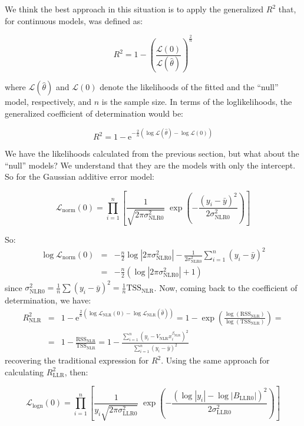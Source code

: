 We think the best approach in this situation is to apply the generalized $R^2$ that, for continuous models, was defined as\cite{genR2}:
\begin{linenomath}
$$ R^2 = 1 - \left(\frac{\mathcal{L}(0)}{\mathcal{L}(\hat\theta)}\right)^{\!\!\frac{2}{n}} $$
\end{linenomath}
where $\mathcal{L}(\hat\theta)$ and $\mathcal{L}(0)$  denote the likelihoods of the fitted and the ``null'' model, respectively, and $n$ is the sample size. In terms of the loglikelihoods, the generalized coefficient of determination would be:
\begin{linenomath}
$$ R^2 = 1 - \mathrm{e}^{-\frac{2}{n}\left(\log\mathcal{L}(\hat\theta)-\log\mathcal{L}(0)\right)} $$
\end{linenomath}
We have the likelihoods calculated from the previous section, but what about the ``null'' models? We understand that they are the models with only the intercept. So for the Gaussian additive error model:
\begin{linenomath}
$$\mathcal{L}_\text{norm}(0) = \prod_{i=1}^n\left[\frac{1}{\sqrt{2\pi\sigma^2_\text{NLR0}}}\;\exp{\left(-\frac{\left(y_i-\bar y\right)^2}{2\sigma^2_\text{NLR0}}\right)}\right]$$
\end{linenomath}
So:
\begin{eqnarray*}
\log\mathcal{L}_\text{norm}(0) &=& -\frac{n}{2}\log\left|2\pi\sigma^2_\text{NLR0}\right| - \frac{1}{2\sigma^2_\text{NLR0}}\sum_{i=1}^n\left(y_i-\bar y\right)^2\\
 &=& -\frac{n}{2}\left(\log\left|2\pi\sigma^2_\text{NLR0}\right| + 1 \right)
\end{eqnarray*}
since $\sigma^2_\text{NLR0}=\frac{1}{n}\sum\left(y_i-\bar y\right)^2=\frac{1}{n}\mathrm{TSS}_\text{NLR}$. Now, coming back to the coefficient of determination, we have:
\begin{eqnarray*}
R^2_\text{NLR} &=& 1 - \mathrm{e}^{\frac{2}{n}\left(\log\mathcal{L}_\text{NLR}(0)-\log\mathcal{L}_\text{NLR}(\hat\theta)\right)} = 1 - \exp{\left(\frac{\log(\mathrm{RSS}_\text{NLR})}{\log(\mathrm{TSS}_\text{NLR})}\right)}
 =\\ &=& 1 - \frac{\mathrm{RSS}_\text{NLR}}{\mathrm{TSS}_\text{NLR}} =
 1 - \frac{\sum_{i=1}^n\left(y_i-V_\text{NLR}x_i^{\beta_\text{NLR}}\right)^2}{\sum_{i=1}^n\left(y_i-\bar y\right)^2}
\end{eqnarray*}
recovering the traditional expression for $R^2$. Using the same approach for calculating $R^2_\text{LLR}$, then:
\begin{linenomath}
$$\mathcal{L}_\text{logn}(0) = \prod_{i=1}^n\left[\frac{1}{y_i\sqrt{2\pi\sigma^2_\text{LLR0}}}\;\exp{\left(-\frac{\left(\log|y_i|-\log|B_\text{LLR0}|\right)^2}{2\sigma^2_\text{LLR0}}\right)}\right]$$
\end{linenomath}
